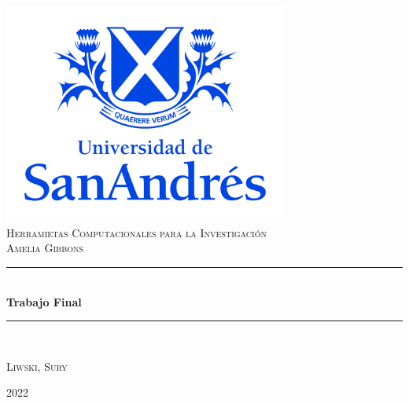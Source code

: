 \documentclass[9pt]{article}
\date{}
\begin{document}
\begin{titlepage} %
	\newcommand{\HRule}{\rule{\linewidth}{0.5mm}} %
	
	\center %
	
	\includegraphics[width=0.7\textwidth]{logoudesa.jpg}\\[0.8cm]
	
	\textsc{\LARGE Herramietas Computacionales para la Investigación}\\[0.5cm] %
	
	\textsc{\Large Amelia Gibbons}\\

	\textcolor{white}{\HRule}\\[0.6cm]
	\huge\bfseries Trabajo Final 
	\textcolor{white}{\HRule}\\[1.5cm]
	\begin{center}
		\Large
		\textsc{Liwski, Sury}\\
	\end{center}
	
	
	\vfill\vfill\vfill %
	{\large 2022}
	\vfill
	
\end{titlepage}
\end{document}
